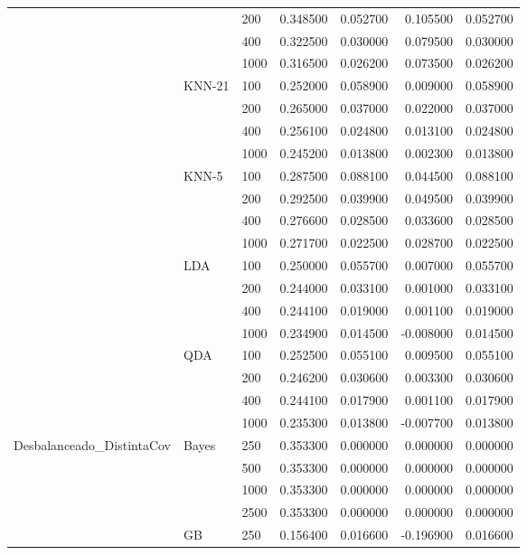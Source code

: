 \begin{tabular}{lllrrrr}
 &  & 200 & 0.348500 & 0.052700 & 0.105500 & 0.052700 \\
 &  & 400 & 0.322500 & 0.030000 & 0.079500 & 0.030000 \\
 &  & 1000 & 0.316500 & 0.026200 & 0.073500 & 0.026200 \\
\cline{2-7}
 & \multirow[t]{4}{*}{KNN-21} & 100 & 0.252000 & 0.058900 & 0.009000 & 0.058900 \\
 &  & 200 & 0.265000 & 0.037000 & 0.022000 & 0.037000 \\
 &  & 400 & 0.256100 & 0.024800 & 0.013100 & 0.024800 \\
 &  & 1000 & 0.245200 & 0.013800 & 0.002300 & 0.013800 \\
\cline{2-7}
 & \multirow[t]{4}{*}{KNN-5} & 100 & 0.287500 & 0.088100 & 0.044500 & 0.088100 \\
 &  & 200 & 0.292500 & 0.039900 & 0.049500 & 0.039900 \\
 &  & 400 & 0.276600 & 0.028500 & 0.033600 & 0.028500 \\
 &  & 1000 & 0.271700 & 0.022500 & 0.028700 & 0.022500 \\
\cline{2-7}
 & \multirow[t]{4}{*}{LDA} & 100 & 0.250000 & 0.055700 & 0.007000 & 0.055700 \\
 &  & 200 & 0.244000 & 0.033100 & 0.001000 & 0.033100 \\
 &  & 400 & 0.244100 & 0.019000 & 0.001100 & 0.019000 \\
 &  & 1000 & 0.234900 & 0.014500 & -0.008000 & 0.014500 \\
\cline{2-7}
 & \multirow[t]{4}{*}{QDA} & 100 & 0.252500 & 0.055100 & 0.009500 & 0.055100 \\
 &  & 200 & 0.246200 & 0.030600 & 0.003300 & 0.030600 \\
 &  & 400 & 0.244100 & 0.017900 & 0.001100 & 0.017900 \\
 &  & 1000 & 0.235300 & 0.013800 & -0.007700 & 0.013800 \\
\cline{1-7} \cline{2-7}
\multirow[t]{32}{*}{Desbalanceado_DistintaCov} & \multirow[t]{4}{*}{Bayes} & 250 & 0.353300 & 0.000000 & 0.000000 & 0.000000 \\
 &  & 500 & 0.353300 & 0.000000 & 0.000000 & 0.000000 \\
 &  & 1000 & 0.353300 & 0.000000 & 0.000000 & 0.000000 \\
 &  & 2500 & 0.353300 & 0.000000 & 0.000000 & 0.000000 \\
\cline{2-7}
 & \multirow[t]{4}{*}{GB} & 250 & 0.156400 & 0.016600 & -0.196900 & 0.016600 \\

\end{tabular}
